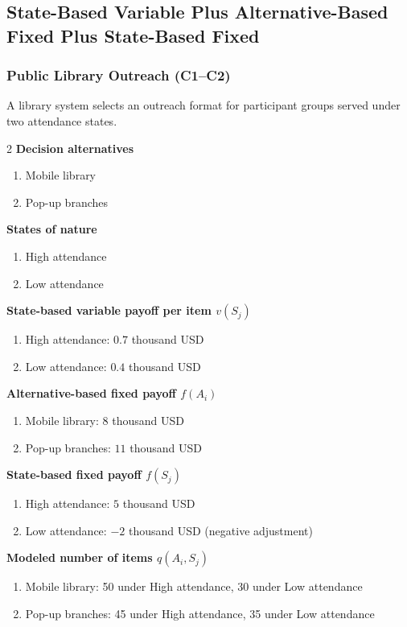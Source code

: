 	\subsection{State-Based Variable Plus Alternative-Based Fixed Plus State-Based Fixed}
	\label{sec:state-based-variable-payoff-plus-alternative-based-fixed-payoff-plus-state-based-fixed-payoff}


	\subsubsection{Public Library Outreach (C1--C2)}
	\label{sec:problem32-public-library-outreach-c1-c2}
	A library system selects an outreach format for participant groups served under two attendance states.
	\begin{multicols}{2}
	\textbf{Decision alternatives}
	\begin{enumerate}[label=\arabic*.]
\item Mobile library
\item Pop-up branches
	\end{enumerate}
	\textbf{States of nature}
	\begin{enumerate}[label=\arabic*.]
\item High attendance
\item Low attendance
	\end{enumerate}
	\columnbreak
	\textbf{State-based variable payoff per item $v(S_j)$}
\begin{enumerate}[label=\arabic*.]
\item High attendance: $0.7$ thousand USD
\item Low attendance: $0.4$ thousand USD\end{enumerate}
\textbf{Alternative-based fixed payoff $f(A_i)$}
\begin{enumerate}[label=\arabic*.]
\item Mobile library: $8$ thousand USD
\item Pop-up branches: $11$ thousand USD\end{enumerate}
\textbf{State-based fixed payoff $f(S_j)$}
\begin{enumerate}[label=\arabic*.]
\item High attendance: $5$ thousand USD
\item Low attendance: $-2$ thousand USD (negative adjustment)\end{enumerate}
\textbf{Modeled number of items $q(A_i,S_j)$}
\begin{enumerate}[label=\arabic*.]
\item Mobile library: 50 under High attendance, 30 under Low attendance
\item Pop-up branches: 45 under High attendance, 35 under Low attendance
\end{enumerate}
	\end{multicols}

